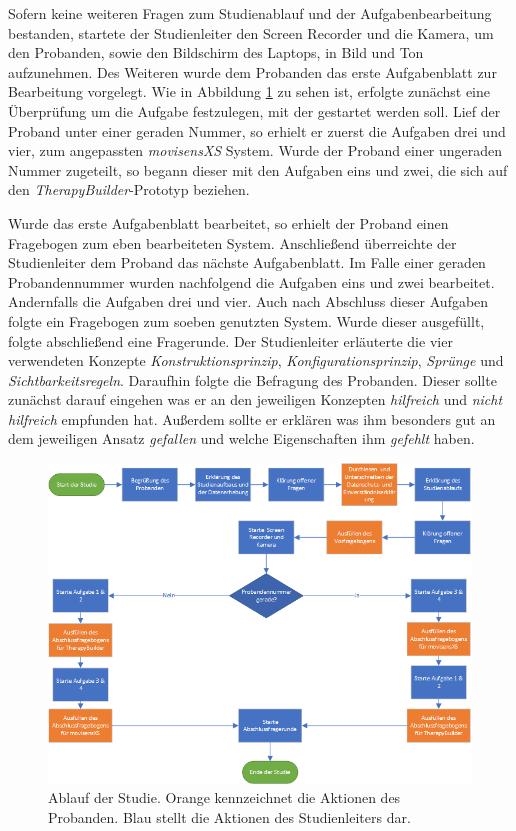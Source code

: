 Sofern keine weiteren Fragen zum Studienablauf und der Aufgabenbearbeitung bestanden, startete der Studienleiter den Screen Recorder und die Kamera, um den Probanden, sowie den Bildschirm des Laptops, in Bild und Ton aufzunehmen. Des Weiteren wurde dem Probanden das erste Aufgabenblatt zur Bearbeitung vorgelegt. Wie in Abbildung \ref{studienablauf} zu sehen ist, erfolgte zunächst eine Überprüfung um die Aufgabe festzulegen, mit der gestartet werden soll. Lief der Proband unter einer geraden Nummer, so erhielt er zuerst die Aufgaben drei und vier, zum angepassten \emph{movisensXS} System. Wurde der Proband einer ungeraden Nummer zugeteilt, so begann dieser mit den Aufgaben eins und zwei, die sich auf den \emph{TherapyBuilder}-Prototyp beziehen. 

Wurde das erste Aufgabenblatt bearbeitet, so erhielt der Proband einen Fragebogen zum eben bearbeiteten System. Anschließend überreichte der Studienleiter dem Proband das nächste Aufgabenblatt. Im Falle einer geraden Probandennummer wurden nachfolgend die Aufgaben eins und zwei bearbeitet. Andernfalls die Aufgaben drei und vier. Auch nach Abschluss dieser Aufgaben folgte ein Fragebogen zum soeben genutzten System. Wurde dieser ausgefüllt, folgte abschließend eine Fragerunde. Der Studienleiter erläuterte die vier verwendeten Konzepte \emph{Konstruktionsprinzip}, \emph{Konfigurationsprinzip}, \emph{Sprünge} und \emph{Sichtbarkeitsregeln}. Daraufhin folgte die Befragung des Probanden. Dieser sollte zunächst darauf eingehen was er an den jeweiligen Konzepten \emph{hilfreich} und \emph{nicht hilfreich} empfunden hat. Außerdem sollte er erklären was ihm besonders gut an dem jeweiligen Ansatz \emph{gefallen} und welche Eigenschaften ihm \emph{gefehlt} haben. 

\begin{figure}[h]
\centering
\includegraphics[width=1\textwidth]{pictures/diagramme/studienablauf-diagramm}
\caption{Ablauf der Studie. Orange kennzeichnet die Aktionen des Probanden. Blau stellt die Aktionen des Studienleiters dar.}
\label{studienablauf}
\end{figure}


